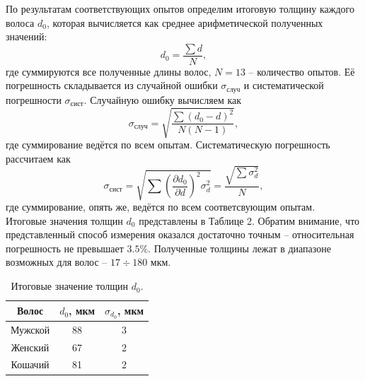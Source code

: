 \documentclass[a4paper,12pt]{article}
\begin{document}
По результатам соответствующих опытов определим итоговую толщину каждого волоса $d_0$, которая вычисляется как среднее арифметической полученных значений:
$$
d_0 = \dfrac{\sum d}{N},
$$
где суммируются все полученные длины волос, $N = 13$ -- количество опытов. Её погрешность складывается из случайной ошибки $\sigma_{\text{случ}}$ и систематической погрешности $\sigma_{\text{сист}}$. Случайную ошибку вычисляем как
$$
\sigma_{\text{случ}} = \sqrt{\dfrac{\sum(d_0 - d)^2}{N(N-1)}},
$$
где суммирование ведётся по всем опытам. Систематическую погрешность рассчитаем как  
$$
\sigma_{\text{сист}} = \sqrt{\sum \left( \dfrac{\partial d_0}{\partial d}\right)^2 \sigma^2_d} = \dfrac{\sqrt{\sum \sigma^2_d}}{N},
$$
где суммирование, опять же, ведётся по всем соответсвующим опытам.\\
Итоговые значения толщин $d_0$ представлены в Таблице 2. Обратим внимание, что представленный способ измерения оказался достаточно точным -- относительная погрешность не превышает $3.5\%$. Полученные толщины лежат в диапазоне возможных для волос -- $17 \div 180$ мкм.
\begin{table}[h]
\begin{tabular}{|c|c|c|}
\hline
Волос   & $d_0$, мкм & $\sigma_{d_0}$, мкм \\ \hline
Мужской & 88       & 3                   \\ \hline
Женский & 67       & 2                 \\ \hline
Кошачий & 81       & 2                 \\ \hline
\end{tabular}
\centering
\caption{Итоговые значение толщин $d_0$.}
\end{table}
\end{document}
